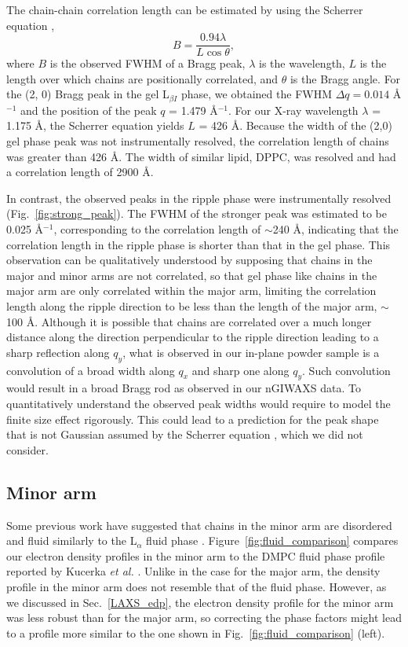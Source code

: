 The chain-chain correlation length can be estimated by using the Scherrer equation 
\cite{ref:Warren69},
\[
  B = \frac{0.94\lambda}{L\cos\theta},
\]
where $B$ is the observed FWHM of a Bragg peak, $\lambda$ is the wavelength,
$L$ is the length over which chains are positionally correlated, 
and $\theta$ is the Bragg angle. For the (2, 0) Bragg peak in
the gel L$_{\beta I}$ phase, we obtained the FWHM $\Delta q = 0.014$ \AA$^{-1}$ and
the position of the peak $q$ = 1.479 \AA$^{-1}$. For our X-ray wavelength
$\lambda$ = 1.175 \AA, the Scherrer equation yields $L$ = 426 \AA. 
Because the width of the (2,0) gel phase peak 
was not instrumentally resolved, the correlation length of chains was 
greater than 426 \AA.
The width of similar lipid, DPPC, was resolved and had a correlation 
length of 2900 \AA \cite{ref:Sun94}.

In contrast, the observed peaks in the ripple phase were instrumentally 
resolved (Fig.~\ref{fig:strong_peak}). 
The FWHM of the stronger peak was estimated to be 0.025 \AA$^{-1}$,
corresponding to the correlation length of $\sim$240 \AA,
indicating that the correlation length in the ripple phase is shorter 
than that in the gel phase.
This observation can be qualitatively understood by supposing that chains in the major
and minor arms are not correlated, so that gel phase like chains in the 
major arm are only correlated within the major arm, limiting the correlation
length along the ripple direction to be less than the length of the major 
arm, $\sim$100 \AA. Although
it is possible that chains are correlated over a much longer distance 
along the direction perpendicular to the ripple direction leading to
a sharp reflection along $q_y$,
what is observed in our in-plane powder sample is a convolution
of a broad width along $q_x$ and sharp one along $q_y$. Such convolution
would result in a broad Bragg rod as observed in our nGIWAXS data.
To quantitatively understand the observed peak widths would require to
model the finite size effect rigorously. This could lead to a prediction
for the peak shape that is not Gaussian assumed by the Scherrer equation 
\cite{ref:Warren69}, which we did not consider.

\subsection{Minor arm}
Some previous work have suggested that chains in the minor arm are disordered 
and fluid similarly to the L$_\alpha$ fluid phase \cite{ref:Schneider83,ref:Sun96,ref:Pabst04,ref:Riske09}.
Figure~\ref{fig:fluid_comparison} compares our electron density profiles
in the minor arm to the DMPC fluid phase profile reported by 
Kucerka \textit{et al.} \cite{Kucerka05_BPJ}.
Unlike in the case for the major arm, the density profile in the minor arm
does not resemble that of the fluid phase. 
However, as we discussed in Sec.~\ref{LAXS_edp}, the electron density profile
for the minor arm was less robust than for the major arm,
so correcting the phase factors might lead to a profile more similar 
to the one shown in Fig.~\ref{fig:fluid_comparison} (left).

